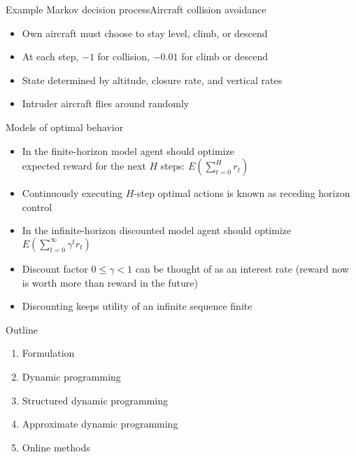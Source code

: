 \documentclass[handout]{dmu}
\begin{document}
\begin{frame}{Example Markov decision process}{Aircraft collision avoidance}
\centering
{}
\vfill
\begin{itemize}
\item<1-> Own aircraft must choose to stay level, climb, or descend
\item<2-> At each step, $-1$ for collision, $-0.01$ for climb or descend
\item<3-> State determined by altitude, closure rate, and vertical rates
\item<4-> Intruder aircraft flies around randomly
\end{itemize}
\vfill
{}
\end{frame}

\begin{frame}{Models of optimal behavior}
\begin{itemize}
\item<1-> In the \alert<1>{finite-horizon model} agent should optimize \\ expected reward for the next $H$ steps: $E(\sum_{t = 0}^H r_t)$
\item<2-> Continuously executing $H$-step optimal actions is known as \alert<1>{receding horizon control}
\item<3-> In the \alert<3>{infinite-horizon discounted model} agent should optimize \\ $E(\sum_{t = 0}^\infty \gamma^t r_t)$ 
\item<4-> \alert<4>{Discount factor} $0 \leq \gamma < 1$ can be thought of as an interest rate (reward now is worth more than reward in the future)
\item<5-> Discounting keeps utility of an infinite sequence finite
\end{itemize}
\end{frame}
\clearfoot

\begin{frame}{Outline}
\begin{enumerate}
\item Formulation
\item \alert{Dynamic programming}
\item Structured dynamic programming
\item Approximate dynamic programming
\item Online methods
\end{enumerate}
\end{frame}
\end{document}
